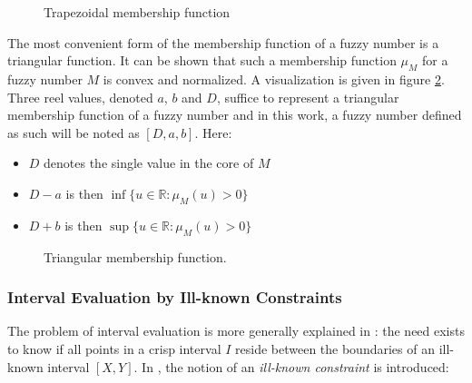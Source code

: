 
\def\JPicScale{0.5}
\begin{figure}[h!]
  \centering
  
  \caption{Trapezoidal membership function}
  \label{fig:trapezoidal}
\end{figure}

The most convenient form of the membership function of a fuzzy number is a triangular function. It can be shown that such a membership function $\mu_M$ for a fuzzy number $M$ is convex and normalized. A visualization is given in figure \ref{fig:triangular}. Three reel values, denoted $a$, $b$ and $D$, suffice to represent a triangular membership function of a fuzzy number and in this work, a fuzzy number defined as such will be noted as $\left[D, a, b \right]$. Here:
\begin{itemize}
\item
$D$ denotes the single value in the core of $M$
\item
$D-a$ is then $\inf \{u \in \mathbb{R} : \mu_{M}(u) > 0\}$
\item
$D+b$ is then $\sup \{u \in \mathbb{R} : \mu_{M}(u) > 0\}$
\end{itemize}
\begin{figure}[h!]
  \centering
  
  \caption{Triangular membership function.}
  \label{fig:triangular}
\end{figure}



\subsubsection{Interval Evaluation by Ill-known Constraints}
The problem of interval evaluation is more generally explained in \cite{Pon11}: the need exists to know if all points in a crisp interval $I$ reside between the boundaries of an ill-known interval $\left[ X , Y \right]$. In \cite{Pon11}, the notion of an \emph{ill-known constraint} is introduced:

